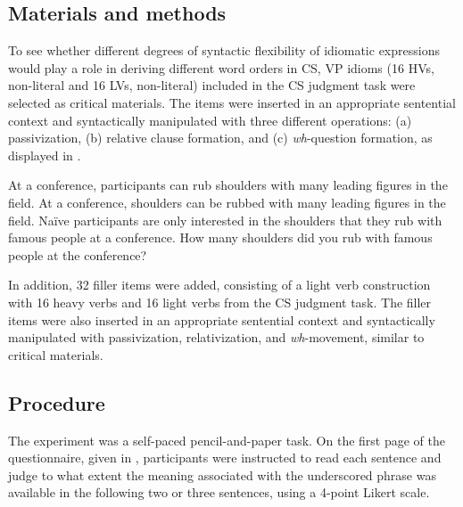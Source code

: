 \subsection{Materials and methods}\label{ch2:sect:2.2.1}

To see whether different degrees of syntactic flexibility of idiomatic expressions would play a role in deriving different word orders in \ac{CS}, \ac{VP} idioms (16 \acsp{HV}, non-literal and 16 \acsp{LV}, non-literal) included in the \ac{CS} judgment task were selected as critical materials. The items were inserted in an appropriate sentential context and syntactically manipulated with three different operations: (a) passivization, (b) relative clause formation, and (c) \textit{wh}-question formation, as displayed in .

\ea\label{ex:39} At a conference, participants can rub shoulders with many leading figures in the field.
    \ea At a conference, shoulders can be rubbed with many leading figures in the field.
    \ex Naïve participants are only interested in the shoulders that they rub with famous people at a conference.
    \ex How many shoulders did you rub with famous people at the conference?
    \z 
\z


In addition, 32 filler items were added, consisting of a light verb construction with 16 heavy verbs and 16 light verbs from the \ac{CS} judgment task. The filler items were also inserted in an appropriate sentential context and syntactically manipulated with passivization, relativization, and \textit{wh}{}-movement, similar to critical materials. 

\subsection{Procedure}\label{ch2:sect:2.2.2.} 

The experiment was a self-paced pencil-and-paper task. On the first page of the questionnaire, given in , participants were instructed to read each sentence and judge to what extent the meaning associated with the underscored phrase was available in the following two or three  sentences, using a 4-point Likert scale. 

